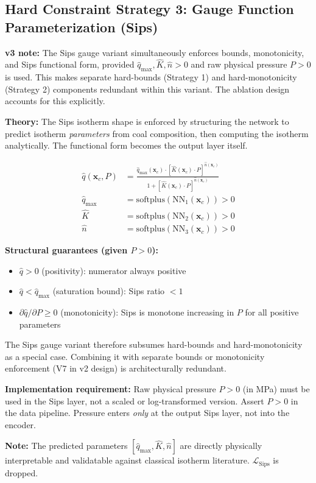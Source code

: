 \documentclass[12pt,a4paper]{article}
\begin{document}
\subsection{Hard Constraint Strategy 3: Gauge Function Parameterization (Sips)}

\begin{changebox}
\textbf{v3 note:} The Sips gauge variant simultaneously enforces bounds,
monotonicity, and Sips functional form, provided $\hat{q}_{\max}, \hat{K},
\hat{n} > 0$ and raw physical pressure $P > 0$ is used. This makes separate
hard-bounds (Strategy 1) and hard-monotonicity (Strategy 2) components
redundant within this variant. The ablation design accounts for this explicitly.
\end{changebox}

\begin{mathbox}
\textbf{Theory:} The Sips isotherm shape is enforced by structuring
the network to predict isotherm \emph{parameters} from coal composition,
then computing the isotherm analytically. The functional form becomes
the output layer itself.

\begin{align}
\hat{q}(\mathbf{x}_c, P) &= \frac{\hat{q}_{\max}(\mathbf{x}_c)
  \cdot [\hat{K}(\mathbf{x}_c)\cdot P]^{\hat{n}(\mathbf{x}_c)}}
  {1 + [\hat{K}(\mathbf{x}_c)\cdot P]^{\hat{n}(\mathbf{x}_c)}} \\[6pt]
\hat{q}_{\max} &= \mathrm{softplus}(\mathrm{NN}_1(\mathbf{x}_c)) > 0 \\[4pt]
\hat{K} &= \mathrm{softplus}(\mathrm{NN}_2(\mathbf{x}_c)) > 0 \\[4pt]
\hat{n} &= \mathrm{softplus}(\mathrm{NN}_3(\mathbf{x}_c)) > 0
\end{align}

\textbf{Structural guarantees (given $P > 0$):}
\begin{itemize}[noitemsep]
  \item $\hat{q} > 0$ (positivity): numerator always positive
  \item $\hat{q} < \hat{q}_{\max}$ (saturation bound): Sips ratio $< 1$
  \item $\partial\hat{q}/\partial P \geq 0$ (monotonicity): Sips is
    monotone increasing in $P$ for all positive parameters
\end{itemize}
The Sips gauge variant therefore subsumes hard-bounds and hard-monotonicity
as a special case. Combining it with separate bounds or monotonicity
enforcement (V7 in v2 design) is architecturally redundant.

\textbf{Implementation requirement:} Raw physical pressure $P > 0$ (in MPa)
must be used in the Sips layer, not a scaled or log-transformed version.
Assert $P > 0$ in the data pipeline. Pressure enters \emph{only} at the
output Sips layer, not into the encoder.

\textbf{Note:} The predicted parameters $[\hat{q}_{\max}, \hat{K}, \hat{n}]$
are directly physically interpretable and validatable against classical
isotherm literature. $\mathcal{L}_{\text{Sips}}$ is dropped.
\end{mathbox}
\end{document}
